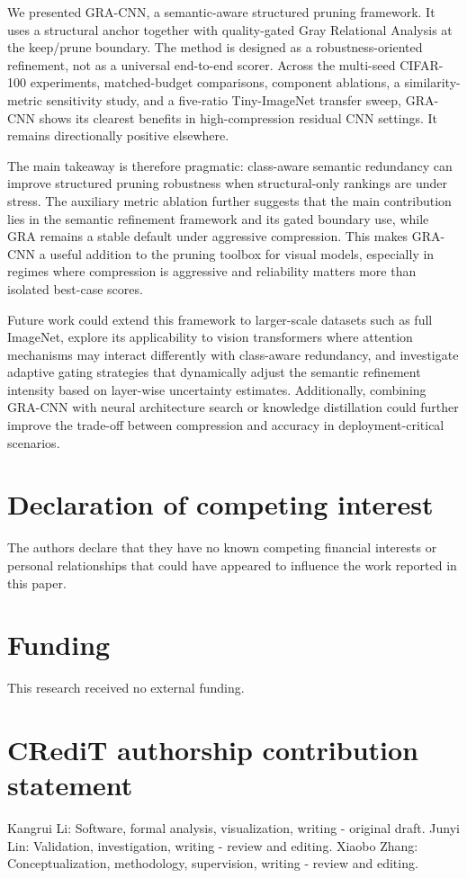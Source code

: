 \documentclass[preprint,12pt]{elsarticle}
\begin{document}
We presented GRA-CNN, a semantic-aware structured pruning framework. It uses a structural anchor together with quality-gated Gray Relational Analysis at the keep/prune boundary. The method is designed as a robustness-oriented refinement, not as a universal end-to-end scorer. Across the multi-seed CIFAR-100 experiments, matched-budget comparisons, component ablations, a similarity-metric sensitivity study, and a five-ratio Tiny-ImageNet transfer sweep, GRA-CNN shows its clearest benefits in high-compression residual CNN settings. It remains directionally positive elsewhere.

The main takeaway is therefore pragmatic: class-aware semantic redundancy can improve structured pruning robustness when structural-only rankings are under stress. The auxiliary metric ablation further suggests that the main contribution lies in the semantic refinement framework and its gated boundary use, while GRA remains a stable default under aggressive compression. This makes GRA-CNN a useful addition to the pruning toolbox for visual models, especially in regimes where compression is aggressive and reliability matters more than isolated best-case scores.

Future work could extend this framework to larger-scale datasets such as full ImageNet, explore its applicability to vision transformers where attention mechanisms may interact differently with class-aware redundancy, and investigate adaptive gating strategies that dynamically adjust the semantic refinement intensity based on layer-wise uncertainty estimates. Additionally, combining GRA-CNN with neural architecture search or knowledge distillation could further improve the trade-off between compression and accuracy in deployment-critical scenarios.

\section*{Declaration of competing interest}
The authors declare that they have no known competing financial interests or personal relationships that could have appeared to influence the work reported in this paper.

\section*{Funding}
This research received no external funding.

\section*{CRediT authorship contribution statement}
Kangrui Li: Software, formal analysis, visualization, writing - original draft. Junyi Lin: Validation, investigation, writing - review and editing. Xiaobo Zhang: Conceptualization, methodology, supervision, writing - review and editing.
\end{document}
